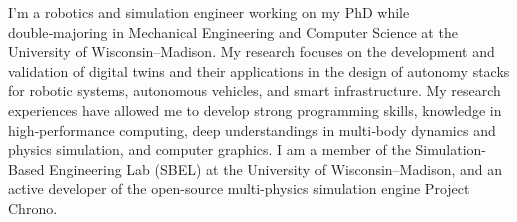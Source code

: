 

\begin{cvparagraph}

I'm a robotics and simulation engineer working on my PhD while double‑majoring in Mechanical Engineering and Computer Science at the University of Wisconsin--Madison. My research focuses on the development and validation of digital twins and their applications in the design of autonomy stacks for robotic systems, autonomous vehicles, and smart infrastructure. My research experiences have allowed me to develop strong programming skills, knowledge in high‑performance computing, deep understandings in multi‑body dynamics and physics simulation, and computer graphics. I am a member of the Simulation-Based Engineering Lab (SBEL) at the University of Wisconsin--Madison, and an active developer of the open-source multi-physics simulation engine Project Chrono.\\


\end{cvparagraph}